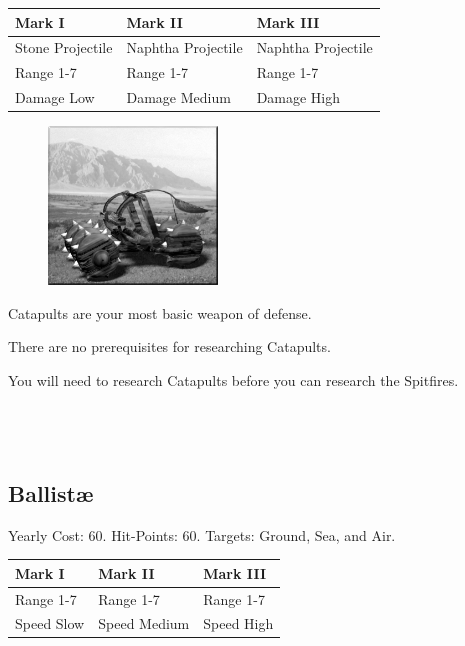 \begin{tabular}{ | p{4cm} | p{4cm} | p{4cm} |}
	\hline
	\textbf{Mark I}	& \textbf{Mark II} & \textbf{Mark III} \\ \hline
	Stone Projectile	& Naphtha Projectile & Naphtha Projectile \\ \hline
	Range 1-7	& Range 1-7& Range 1-7 \\ \hline
	Damage Low	& Damage Medium & Damage High \\ \hline
	\hline
\end{tabular}

\begin{figure}
	\vspace{-20pt}
	\begin{center}
		\includegraphics[width=0.4\textwidth]{Acatapult}
	\end{center}
	\vspace{-20pt}
\end{figure}

Catapults are your most basic weapon of defense. 

There are no prerequisites for researching Catapults. 

You will need to research Catapults before you can research the Spitfires. \\ \\ \\ \\

\subsection{Ballistæ}


\begin{center}
	Yearly Cost: 60. Hit-Points: 60. Targets: Ground, Sea, and Air.
\end{center}

\begin{tabular}{ | p{4cm} | p{4cm} | p{4cm} |}
	\hline
	\textbf{Mark I}	& \textbf{Mark II} & \textbf{Mark III} \\ \hline
	Range 1-7	& Range 1-7& Range 1-7 \\ \hline
	Speed Slow	& Speed Medium & Speed High \\ \hline
	\hline
\end{tabular}

